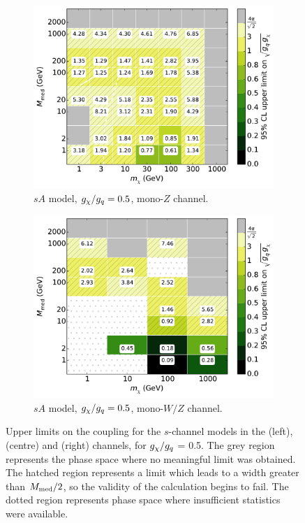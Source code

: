 \begin{figure}
\begin{subfigure}[t]{0.32\textwidth}
    \includegraphics[width=1.\textwidth]{figures/grid_allpoints_SAD_rat05.pdf}
    \caption{$sA$ model, $g_{\chi}/g_q = 0.5$, mono-$Z$ channel.}
  \end{subfigure}
  \begin{subfigure}[t]{0.32\textwidth}
    \centering
    \includegraphics[width=1.\textwidth]{figures/grid_basepoints_SAD_rat05_monoWZ.pdf}
    \caption{$sA$ model, $g_{\chi}/g_q = 0.5$, mono-$W/Z$ channel.}
  \end{subfigure}
  \caption{Upper limits on the coupling for the $s$-channel models in the \monojet (left), \monoZ (centre) and \monoWZ (right) channels, for $g_{\chi} / g_q$ = 0.5. The grey region represents the phase space where no meaningful limit was obtained. The hatched region represents a limit which leads to a width greater than $M_{\mathrm{med}} / 2$, so the validity of the calculation begins to fail. The dotted region represents phase space where insufficient statistics were available.}
  \label{fig:results_sVsA_rat05}
\end{figure}

